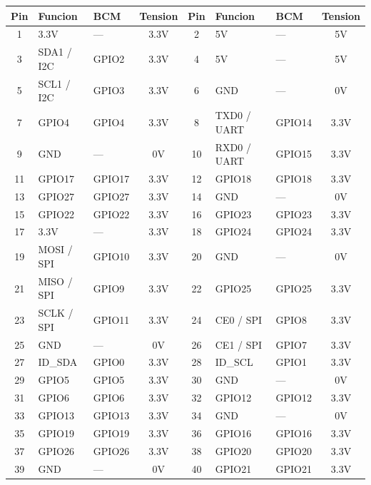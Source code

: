 \documentclass[11pt,a4paper,oneside]{report}
\begin{document}
\begin{center}
\footnotesize
\begin{tabular}{|c|l|l|c||c|l|l|c|}
\hline
\textbf{Pin} & \textbf{Funcion} & \textbf{BCM} & \textbf{Tension} & \textbf{Pin} & \textbf{Funcion} & \textbf{BCM} & \textbf{Tension} \\
\hline
1  & 3.3V        & ---    & 3.3V & 2  & 5V          & ---    & 5V \\
3  & SDA1 / I2C  & GPIO2  & 3.3V & 4  & 5V          & ---    & 5V \\
5  & SCL1 / I2C  & GPIO3  & 3.3V & 6  & GND         & ---    & 0V \\
7  & GPIO4       & GPIO4  & 3.3V & 8  & TXD0 / UART & GPIO14 & 3.3V \\
9  & GND         & ---    & 0V   & 10 & RXD0 / UART & GPIO15 & 3.3V \\
11 & GPIO17      & GPIO17 & 3.3V & 12 & GPIO18      & GPIO18 & 3.3V \\
13 & GPIO27      & GPIO27 & 3.3V & 14 & GND         & ---    & 0V \\
15 & GPIO22      & GPIO22 & 3.3V & 16 & GPIO23      & GPIO23 & 3.3V \\
17 & 3.3V        & ---    & 3.3V & 18 & GPIO24      & GPIO24 & 3.3V \\
19 & MOSI / SPI  & GPIO10 & 3.3V & 20 & GND         & ---    & 0V \\
21 & MISO / SPI  & GPIO9  & 3.3V & 22 & GPIO25      & GPIO25 & 3.3V \\
23 & SCLK / SPI  & GPIO11 & 3.3V & 24 & CE0 / SPI   & GPIO8  & 3.3V \\
25 & GND         & ---    & 0V   & 26 & CE1 / SPI   & GPIO7  & 3.3V \\
27 & ID\_SDA     & GPIO0  & 3.3V & 28 & ID\_SCL     & GPIO1  & 3.3V \\
29 & GPIO5       & GPIO5  & 3.3V & 30 & GND         & ---    & 0V \\
31 & GPIO6       & GPIO6  & 3.3V & 32 & GPIO12      & GPIO12 & 3.3V \\
33 & GPIO13      & GPIO13 & 3.3V & 34 & GND         & ---    & 0V \\
35 & GPIO19      & GPIO19 & 3.3V & 36 & GPIO16      & GPIO16 & 3.3V \\
37 & GPIO26      & GPIO26 & 3.3V & 38 & GPIO20      & GPIO20 & 3.3V \\
39 & GND         & ---    & 0V   & 40 & GPIO21      & GPIO21 & 3.3V \\
\hline
\end{tabular}
\end{center}
\end{document}
